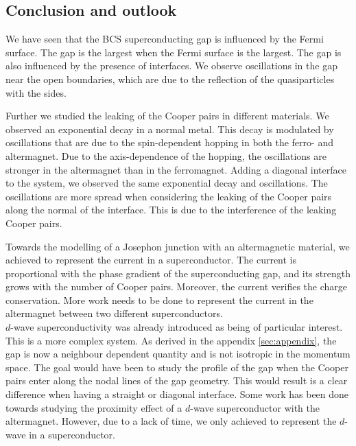 \documentclass[..\main.tex]{subfile}
\begin{document}
\subsection{Conclusion and outlook}
We have seen that the BCS superconducting gap is influenced by the Fermi surface. The gap is the largest when the Fermi surface is the largest.
The gap is also influenced by the presence of interfaces. We observe oscillations in the gap near the open boundaries, which are due to the reflection
of the quasiparticles with the sides.

Further we studied the leaking of the Cooper pairs in different materials. We observed an exponential decay in a normal metal.
This decay is modulated by oscillations that are due to the spin-dependent hopping in both the ferro- and altermagnet.
Due to the axis-dependence of the hopping, the oscillations are stronger in the altermagnet than in the ferromagnet.
Adding a diagonal interface to the system, we observed the same exponential decay and oscillations. The oscillations are more spread when considering
the leaking of the Cooper pairs along the normal of the interface. This is due to the interference of the leaking Cooper pairs.

Towards the modelling of a Josephon junction with an altermagnetic material, we achieved to represent the current in a superconductor.
The current is proportional with the phase gradient of the superconducting gap, and its strength grows with the number of Cooper pairs.
Moreover, the current verifies the charge conservation.
More work needs to be done to represent the current in the altermagnet between two different superconductors.\\

$d$-wave superconductivity was already introduced as being of particular interest. This is a more complex system.
As derived in the appendix \ref{sec:appendix}, the gap is now a neighbour dependent quantity and is not isotropic in the momentum space. The goal would have been 
to study the profile of the gap when the Cooper pairs enter along the nodal lines of the gap geometry. This
would result is a clear difference when having a straight or diagonal interface. 
 Some work has been done towards studying the
proximity effect of a $d$-wave superconductor with the altermagnet. However, due to a lack of time, we only achieved to represent the $d$-wave in a superconductor.
\end{document}
